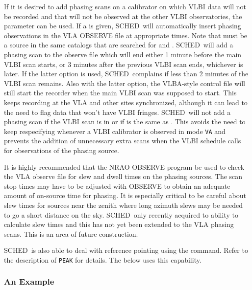 \documentclass{report}
\newcommand{\schedb}{{\sc SCHED~}}
\begin{document}
If it is desired to add phasing scans on a calibrator on which VLBI
data will not be recorded and that will not be observed at the other
VLBI observatories, the parameter 
can be used.  If a  is given,
\schedb will automatically insert phasing observations in the VLA
OBSERVE file at appropriate times.  Note that  must be a source in the same catalogs that are
searched for  and . \schedb will add a phasing scan to the observe
file which will end either 1 minute before the main VLBI scan starts,
or 3 minutes after the previous VLBI scan ends, whichever is later.
If the latter option is used, \schedb complains if less than 2 minutes
of the VLBI scan remains.  Also with the latter option, the VLBA-style
control file will still start the recorder when the main VLBI scan
was supposed to start. This keeps recording at the VLA and other
sites synchronized, although it can lead to the need to flag data that
won't have VLBI fringes. \schedb will not add a phasing scan if the
VLBI scan is in  or if
 is the same as . This avoids the need to keep respecifying
 whenever a VLBI calibrator is
observed in mode {\tt VA} and prevents the addition of unnecessary
extra scans when the VLBI schedule calls for observations of the
phasing source.

It is highly recommended that the NRAO {\sc OBSERVE} program be used
to check the VLA observe file for slew and dwell times on the phasing
sources. The scan stop times may have to be adjusted with {\sc
OBSERVE} to obtain an adequate amount of on-source time for phasing.
It is especially critical to be careful about slew times for sources
near the zenith where long azimuth slews may be needed to go a short
distance on the sky.  \schedb only recently acquired to ability to
calculate slew times and this has not yet been extended to the VLA
phasing scans.  This is an area of future construction.

\schedb is also able to deal with reference pointing using the
 command.  Refer to the description
of {\tt PEAK} for details.  The 
below uses this capability.

\subsubsection{\label{SSSEC:VLBIEG}An Example}
\end{document}
